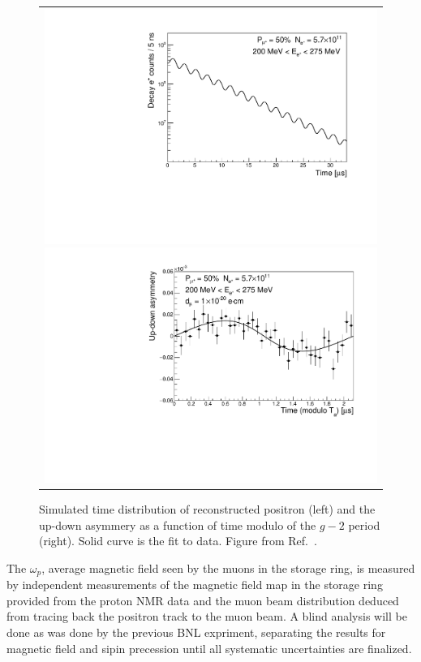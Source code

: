 \begin{figure}[t]
  \centering
    \begin{tabular}{c}

      \begin{minipage}{0.5\hsize}
        \centering
        \includegraphics[width=0.7\linewidth, angle=270, bb=20 255 428 822]{Fig/WigglePlot.pdf}
      \end{minipage}

      \begin{minipage}{0.5\hsize}
        \centering
        \includegraphics[width=0.7\linewidth, angle=270, bb=20 255 428 822]{Fig/EDMModuloPlot_20_40.pdf}
      \end{minipage}
    \end{tabular}

    \caption{Simulated time distribution of reconstructed positron (left) 
      and the up-down asymmery as a function of time modulo of the $g-2$ period (right).
      Solid curve is the fit to data. Figure from Ref.~\cite{TDRsummarypaper}.}
    \label{fig:Wiggle}
\end{figure}

The $\omega_p$, average magnetic field seen by the muons in the storage ring, is 
measured by independent measurements of the magnetic field map in the storage ring provided from the proton
NMR data and the muon beam distribution deduced from tracing back the positron track to the muon beam.
A blind analysis will be done as was done by the previous BNL expriment, separating the results for 
magnetic field and sipin precession until all systematic uncertainties are finalized.

